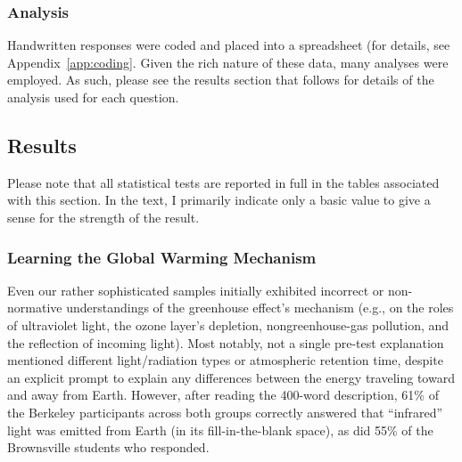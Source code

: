 \subsubsection{Analysis}

Handwritten responses were coded and placed into a spreadsheet (for details, see
Appendix~\ref{app:coding}. Given the rich nature of these data, many analyses
were employed. As such, please see the results section that follows for details
of the analysis used for each question.

\subsection{Results}

Please note that all statistical tests are reported in full in the tables
associated with this section. In the text, I primarily indicate only a basic
value to give a sense for the strength of the result.

\subsubsection{Learning the Global Warming Mechanism}

Even our rather sophisticated samples initially exhibited incorrect or
non-normative understandings of the greenhouse effect’s mechanism (e.g., on the
roles of ultraviolet light, the ozone layer’s depletion, nongreenhouse-gas
pollution, and the reflection of incoming light). Most notably, not a single
pre-test explanation mentioned different light/radiation types or atmospheric
retention time, despite an explicit prompt to explain any differences between
the energy traveling toward and away from Earth. However, after reading the
400-word description, 61\% of the Berkeley participants across both groups
correctly answered that “infrared” light was emitted from Earth (in its
fill-in-the-blank space), as did 55\% of the Brownsville students who responded.

